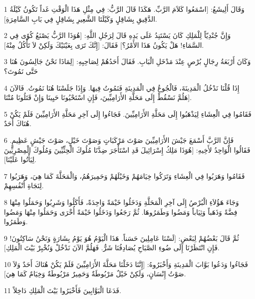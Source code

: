 \par 1 وَقَالَ أَلِيشَعُ: [اسْمَعُوا كَلاَمَ الرَّبِّ. هَكَذَا قَالَ الرَّبُّ: فِي مِثْلِ هَذَا الْوَقْتِ غَداً تَكُونُ كَيْلَةُ الدَّقِيقِ بِشَاقِلٍ وَكَيْلَتَا الشَّعِيرِ بِشَاقِلٍ فِي بَابِ السَّامِرَةِ].
\par 2 وَإِنَّ جُنْدِيّاً لِلْمَلِكِ كَانَ يَسْتَنِدُ عَلَى يَدِهِ قَالَ لِرَجُلِ اللَّهِ: [هُوَذَا الرَّبُّ يَصْنَعُ كُوًى فِي السَّمَاءِ! هَلْ يَكُونُ هَذَا الأَمْرُ؟] فَقَالَ: [إِنَّكَ تَرَى بِعَيْنَيْكَ وَلَكِنْ لاَ تَأْكُلُ مِنْهُ].
\par 3 وَكَانَ أَرْبَعَةُ رِجَالٍ بُرْصٍ عِنْدَ مَدْخَلِ الْبَابِ. فَقَالَ أَحَدُهُمْ لِصَاحِبِهِ: [لِمَاذَا نَحْنُ جَالِسُونَ هُنَا حَتَّى نَمُوتَ؟
\par 4 إِذَا قُلْنَا نَدْخُلُ الْمَدِينَةَ، فَالْجُوعُ فِي الْمَدِينَةِ فَنَمُوتُ فِيهَا. وَإِذَا جَلَسْنَا هُنَا نَمُوتُ. فَالآنَ هَلُمَّ نَسْقُطْ إِلَى مَحَلَّةِ الأَرَامِيِّينَ، فَإِنِ اسْتَحْيُونَا حَيِينَا وَإِنْ قَتَلُونَا مُتْنَا].
\par 5 فَقَامُوا فِي الْعِشَاءِ لِيَذْهَبُوا إِلَى مَحَلَّةِ الأَرَامِيِّينَ. فَجَاءُوا إِلَى آخِرِ مَحَلَّةِ الأَرَامِيِّينَ فَلَمْ يَكُنْ هُنَاكَ أَحَدٌ.
\par 6 فَإِنَّ الرَّبَّ أَسْمَعَ جَيْشَ الأَرَامِيِّينَ صَوْتَ مَرْكَبَاتٍ وَصَوْتَ خَيْلٍ، صَوْتَ جَيْشٍ عَظِيمٍ. فَقَالُوا الْوَاحِدُ لأَخِيهِ: [هُوَذَا مَلِكُ إِسْرَائِيلَ قَدِ اسْتَأْجَرَ ضِدَّنَا مُلُوكَ الْحِثِّيِّينَ وَمُلُوكَ الْمِصْرِيِّينَ لِيَأْتُوا عَلَيْنَا].
\par 7 فَقَامُوا وَهَرَبُوا فِي الْعِشَاءِ وَتَرَكُوا خِيَامَهُمْ وَخَيْلَهُمْ وَحَمِيرَهُمُ، وَالْمَحَلَّةَ كَمَا هِيَ، وَهَرَبُوا لِنَجَاةِ أَنْفُسِهِمْ.
\par 8 وَجَاءَ هَؤُلاَءِ الْبُرْصُ إِلَى آخِرِ الْمَحَلَّةِ وَدَخَلُوا خَيْمَةً وَاحِدَةً، فَأَكَلُوا وَشَرِبُوا وَحَمَلُوا مِنْهَا فِضَّةً وَذَهَباً وَثِيَاباً وَمَضُوا وَطَمَرُوهَا. ثُمَّ رَجَعُوا وَدَخَلُوا خَيْمَةً أُخْرَى وَحَمَلُوا مِنْهَا وَمَضُوا وَطَمَرُوا.
\par 9 ثُمَّ قَالَ بَعْضُهُمْ لِبَعْضٍ: [لَسْنَا عَامِلِينَ حَسَناً. هَذَا الْيَوْمُ هُوَ يَوْمُ بِشَارَةٍ وَنَحْنُ سَاكِتُونَ! فَإِنِ انْتَظَرْنَا إِلَى ضُوءِ الصَّبَاحِ يُصَادِفُنَا شَرٌّ. فَهَلُمَّ الآنَ نَدْخُلْ وَنُخْبِرْ بَيْتَ الْمَلِكِ].
\par 10 فَجَاءُوا وَدَعُوا بَوَّابَ الْمَدِينَةِ وَأَخْبَرُوهُ: [إِنَّنَا دَخَلْنَا مَحَلَّةَ الأَرَامِيِّينَ فَلَمْ يَكُنْ هُنَاكَ أَحَدٌ وَلاَ صَوْتُ إِنْسَانٍ، وَلَكِنْ خَيْلٌ مَرْبُوطَةٌ وَحَمِيرٌ مَرْبُوطَةٌ وَخِيَامٌ كَمَا هِيَ].
\par 11 فَدَعَا الْبَوَّابِينَ فَأَخْبَرُوا بَيْتَ الْمَلِكِ دَاخِلاً.

